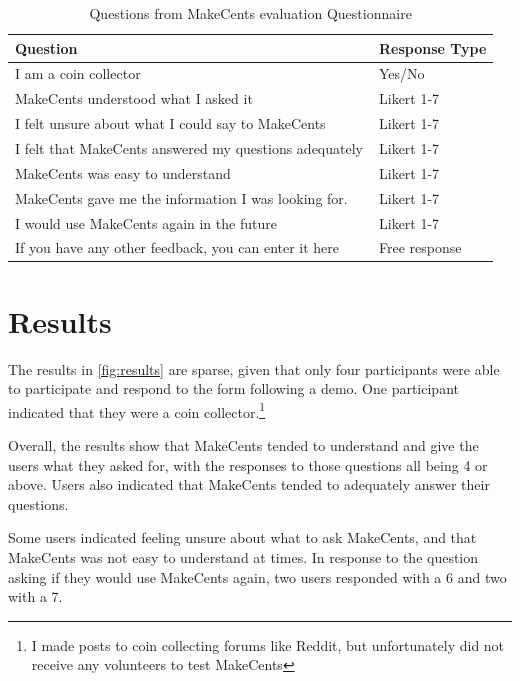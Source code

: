 \documentclass[11pt,a4paper]{article}
\begin{document}
\begin{table}[ht]
    \centering
    \small
    \begin{tabular}{p{0.75\linewidth} p{0.25\linewidth}}
        \toprule
        \textbf{Question} & \textbf{Response Type} \\
        \midrule
        I am a coin collector & Yes/No \\
        \midrule
        MakeCents understood what I asked it & Likert 1-7 \\
        \midrule
        I felt unsure about what I could say to MakeCents & Likert 1-7 \\
        \midrule
        I felt that MakeCents answered my questions adequately & Likert 1-7 \\
        \midrule
        MakeCents was easy to understand & Likert 1-7 \\
        \midrule
        MakeCents gave me the information I was looking for. & Likert 1-7 \\
        \midrule
        I would use MakeCents again in the future & Likert 1-7 \\
        \midrule
        If you have any other feedback, you can enter it here & Free \linebreak response \\
        \bottomrule
    \end{tabular}
    \caption{Questions from MakeCents evaluation Questionnaire}
    \label{tab:questions}
\end{table}


\section{Results}\label{sec:results}
The results in \cref{fig:results} are sparse, given that only four participants were able to participate and respond to the form following a demo. One participant indicated that they were a coin collector.\footnote{I made posts to coin collecting forums like Reddit, but unfortunately did not receive any volunteers to test MakeCents}

Overall, the results show that MakeCents tended to understand and give the users what they asked for, with the responses to those questions all being 4 or above. Users also indicated that MakeCents tended to adequately answer their questions.

Some users indicated feeling unsure about what to ask MakeCents, and that MakeCents was not easy to understand at times. In response to the question asking if they would use MakeCents again, two users responded with a 6 and two with a 7. 
\end{document}
